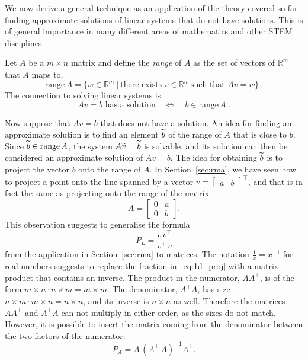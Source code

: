 \begin{application}
	We now derive a general technique as an application of the theory covered so far: finding approximate solutions of linear systems that do not have solutions. This is of general importance in many different areas of mathematics and other STEM disciplines.
	
	Let $A$ be a $m \times n$ matrix and define the \emph{range} of $A$ as the set of vectors of $\mathbb{R}^m$ that $A$ maps to,
	\[ \mathrm{range} \, A = \{ w \in \mathbb{R}^m \: | \: 
	\text{there exists } v \in \mathbb{R}^n \text{ such that } Av=w \} \:. \]
	The connection to solving linear systems is
	\[ Av = b \text{ has a solution} \quad \Longleftrightarrow
	\quad b \in \mathrm{range}\, A \:. \]
	
	Now suppose that $Av=b$ that does not have a solution. An idea for finding an approximate solution is to find an element $\widetilde{b}$ of the range of $A$ that is close to $b$. Since $\widetilde{b} \in \mathrm{range} \, A$, the system $A\widetilde{v}=\widetilde{b}$ is solvable, and its solution can then be considered an approximate solution of $Av=b$. The idea for obtaining $\widetilde{b}$ is to project the vector $b$ onto the range of $A$. In Section~\ref{sec:rma}, we have seen how to project a point onto the line spanned by a vector $v = \begin{bmatrix} a & b
	\end{bmatrix}^\top$, and that is in fact the same as projecting onto the range of the matrix 
	\[ A = \begin{bmatrix} 0 & a \\ 0 & b \end{bmatrix}. \]
	This observation suggests to generalise the formula 
	\begin{equation}
	\label{eq:1d_proj}
	P_L = \frac{v \, v^\top}{v^\top \, v}
	\end{equation}
	from the application in Section~\ref{sec:rma} to matrices. The notation $\tfrac{1}{x} = x^{-1}$ for real numbers suggests to replace the fraction in~\eqref{eq:1d_proj} with a matrix product that contains an inverse. The product in the numerator, $A A^\top$, is of the form $m \times n \cdot n \times m = m \times m$. The denominator, $A^\top A$,  has size $n \times m \cdot m \times n = n \times n$, and its inverse is $n \times n$ as well. Therefore the matrices $A A^\top$ and $A^\top A$ can not multiply in either order, as the sizes do not match. However, it is possible to insert the matrix coming from the denominator between the two factors of the numerator:
	\[ P_A = A \, (A^\top \, A)^{-1} A^\top. \]
	

\end{application}
